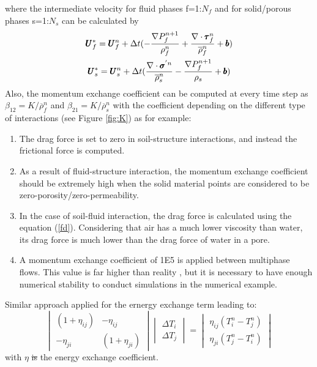 \documentclass[preprint,12pt]{elsarticle}
\providecommand{\DIFadd}[1]{{\protect\color{blue}\uwave{#1}}} %
\providecommand{\DIFdel}[1]{{\protect\color{red}\sout{#1}}}                      %
\providecommand{\DIFaddbegin}{} %
\providecommand{\DIFaddend}{} %
\providecommand{\DIFdelbegin}{} %
\providecommand{\DIFdelend}{} %
\newcommand{\DIFscaledelfig}{0.5}
\newlength{\DIFdelgraphicswidth} %
\newlength{\DIFdelgraphicsheight} %
\newcommand{\DIFaddincludegraphics}[2][]{{\color{blue}\fbox{\DIFOincludegraphics[#1]{#2}}}} %
\newcommand{\DIFdelincludegraphics}[2][]{%
\sbox{\DIFdelgraphicsbox}{\DIFOincludegraphics[#1]{#2}}%
\settoboxwidth{\DIFdelgraphicswidth}{\DIFdelgraphicsbox} %
\settoboxtotalheight{\DIFdelgraphicsheight}{\DIFdelgraphicsbox} %
\scalebox{\DIFscaledelfig}{%
\parbox[b]{\DIFdelgraphicswidth}{\usebox{\DIFdelgraphicsbox}\\[-\baselineskip] \rule{\DIFdelgraphicswidth}{0em}}\llap{\resizebox{\DIFdelgraphicswidth}{\DIFdelgraphicsheight}{%
\setlength{\unitlength}{\DIFdelgraphicswidth}%
\begin{picture}(1,1)%
\thicklines\linethickness{2pt} %
{\color[rgb]{1,0,0}\put(0,0){\framebox(1,1){}}}%
{\color[rgb]{1,0,0}\put(0,0){\line( 1,1){1}}}%
{\color[rgb]{1,0,0}\put(0,1){\line(1,-1){1}}}%
\end{picture}%
}\hspace*{3pt}}} %
} %
\DeclareRobustCommand{\DIFaddbegin}{\DIFOaddbegin \let\includegraphics\DIFaddincludegraphics} %
\DeclareRobustCommand{\DIFaddend}{\DIFOaddend \let\includegraphics\DIFOincludegraphics} %
\DeclareRobustCommand{\DIFdelbegin}{\DIFOdelbegin \let\includegraphics\DIFdelincludegraphics} %
\DeclareRobustCommand{\DIFdelend}{\DIFOaddend \let\includegraphics\DIFOincludegraphics} %
\begin{document}
%
%
where the intermediate velocity for fluid phases f=1:$N_f$ and for solid/porous phases s=1:$N_s$ can be calculated by\DIFaddbegin \DIFadd{:
}\DIFaddend %
\begin{equation}
\begin{gathered}
\pmb{U}_{f}^{*} = \pmb{U}_{f}^{n} + \Delta{t} (-\frac{\nabla P_{f}^{n+1}}{\rho_f^n}  + \frac{\nabla \cdot \pmb{\tau}_f^{n}}{\overline{\rho}^n_{f}} + \pmb{b}) \\
\pmb{U}_{s}^{*} = \pmb{U}_{s}^{n} + \Delta{t} (\frac{\nabla \cdot \pmb{\sigma}^{'n}}{\overline{\rho}^n_{s}}    - \frac{\nabla P_{f}^{n+1}}{\rho_s}  + \pmb{b})
\end {gathered}
\end {equation}
%
%
Also, the momentum exchange coefficient can be computed at every time step as $\beta_{12} = K/\overline{\rho}_{f}^n$ and $\beta_{21} = K/\overline{\rho}_{s}^n$ with the coefficient depending on the different type of interactions (see Figure \ref{fig:K}) as for example: \\
\begin{enumerate}
\item The drag force is set to zero in soil-structure interactions, and instead the frictional force is computed.
\item As a result of fluid-structure interaction, the momentum exchange coefficient should be extremely high \DIFaddbegin \DIFadd{(1E15) }\DIFaddend when the solid material points are considered to be zero-porosity/zero-permeability.
\item In the case of soil-fluid interaction, the drag force is calculated using the equation (\ref{fd}). Considering that air has a much lower viscosity than water, its drag force is much lower than the drag force of water in a pore.
\item A momentum exchange coefficient of 1E5 is applied between multiphase flows. This value is far higher than reality \cite{Stewart1974}, but it is necessary to have enough numerical stability to conduct simulations in the numerical example.
\end {enumerate}
Similar approach applied for the ernergy exchange term leading to:
%
%
\[ \begin{vmatrix} (1 + \eta_{ij})  &  -\eta_{ij} \\
                  -\eta_{ji}       &  (1 + \eta_{ji})
    \end {vmatrix}
    \begin{vmatrix} \Delta T_{i} \\
                    \Delta T_{j}
    \end {vmatrix}
    =
    \begin{vmatrix}  \eta_{ij}(T_{i}^{n} - T_{j}^{n}) \\
                    \eta_{ji}(T_{j}^{n} - T_i^{n})
    \end {vmatrix}                
\]
with $\eta$ \DIFdelbegin \DIFdel{is }\DIFdelend \DIFaddbegin \DIFadd{being }\DIFaddend the energy exchange coefficient.
\DIFdelbegin %
\DIFdelend %
\end{document}
